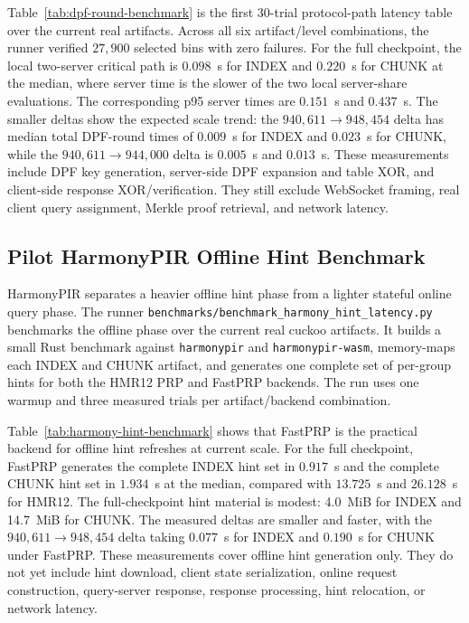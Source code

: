 Table~\ref{tab:dpf-round-benchmark} is the first 30-trial protocol-path latency table over the current real artifacts. Across all six artifact/level combinations, the runner verified $27{,}900$ selected bins with zero failures. For the full checkpoint, the local two-server critical path is $0.098$~s for INDEX and $0.220$~s for CHUNK at the median, where server time is the slower of the two local server-share evaluations. The corresponding p95 server times are $0.151$~s and $0.437$~s. The smaller deltas show the expected scale trend: the $940{,}611 \to 948{,}454$ delta has median total DPF-round times of $0.009$~s for INDEX and $0.023$~s for CHUNK, while the $940{,}611 \to 944{,}000$ delta is $0.005$~s and $0.013$~s. These measurements include DPF key generation, server-side DPF expansion and table XOR, and client-side response XOR/verification. They still exclude WebSocket framing, real client query assignment, Merkle proof retrieval, and network latency.

\subsection{Pilot HarmonyPIR Offline Hint Benchmark}

HarmonyPIR separates a heavier offline hint phase from a lighter stateful online query phase. The runner \texttt{benchmarks/benchmark\_harmony\_hint\_latency.py} benchmarks the offline phase over the current real cuckoo artifacts. It builds a small Rust benchmark against \texttt{harmonypir} and \texttt{harmonypir-wasm}, memory-maps each INDEX and CHUNK artifact, and generates one complete set of per-group hints for both the HMR12 PRP and FastPRP backends. The run uses one warmup and three measured trials per artifact/backend combination.



Table~\ref{tab:harmony-hint-benchmark} shows that FastPRP is the practical backend for offline hint refreshes at current scale. For the full checkpoint, FastPRP generates the complete INDEX hint set in $0.917$~s and the complete CHUNK hint set in $1.934$~s at the median, compared with $13.725$~s and $26.128$~s for HMR12. The full-checkpoint hint material is modest: 4.0~MiB for INDEX and 14.7~MiB for CHUNK. The measured deltas are smaller and faster, with the $940{,}611 \to 948{,}454$ delta taking $0.077$~s for INDEX and $0.190$~s for CHUNK under FastPRP. These measurements cover offline hint generation only. They do not yet include hint download, client state serialization, online request construction, query-server response, response processing, hint relocation, or network latency.


